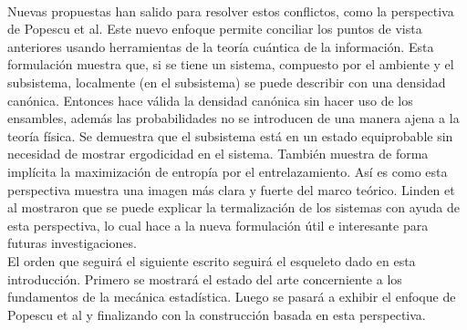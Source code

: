 \\
Nuevas propuestas han salido para resolver estos conflictos, como la perspectiva de Popescu et al. Este nuevo enfoque permite conciliar los puntos de vista anteriores usando herramientas de la teoría cuántica de la información. Esta formulación muestra que, si se tiene un sistema, compuesto por el ambiente y el subsistema, localmente (en el subsistema) se puede describir con una densidad canónica. Entonces hace válida la densidad canónica sin hacer uso de los ensambles, además las probabilidades no se introducen de una manera ajena a la teoría física. Se demuestra que el subsistema está en un estado equiprobable sin necesidad de mostrar ergodicidad en el sistema. También muestra de forma implícita la maximización de entropía por el entrelazamiento. Así es como esta perspectiva muestra una imagen más clara y fuerte del marco teórico. Linden et al \cite{LindenPaper} mostraron que se puede explicar la termalización de los sistemas con ayuda de esta perspectiva, lo cual hace a la nueva formulación útil e interesante para futuras investigaciones.
\\
El orden que seguirá el siguiente escrito seguirá el esqueleto dado en esta introducción. Primero se mostrará el estado del arte concerniente a los fundamentos de la mecánica estadística. Luego se pasará a exhibir el enfoque de Popescu et al y finalizando con  la construcción basada en esta perspectiva. 

